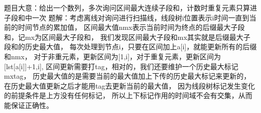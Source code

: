 题目大意：给出一个数列，多次询问区间最大连续子段和，计数时重复元素只算进子段和中一次
题解：考虑离线对询问进行扫描线，线段树i位置表示i时间一直到当前的时间节点的累加值，
区间最大值nmx表示当前时间为终点的后缀最大子段和，记mx为区间最大子段和，
我们发现区间最大子段和mx其实就是后缀最大子段和的历史最大值，
每次处理到节点i，只要在区间加上a[i]，就能更新所有的后缀和nmx，
对于非重元素，更新区间为[1,i]，对于重复元素，更新区间为[lst[a[i]]+1,i],
区间更新需要打tag，相对的，我们还要维护一个历史最大标记mxtag，
历史最大值的是需要当前的最大值加上下传的历史最大标记来更新的，
在历史最大值更新之后才能用tag去更新当前的最大值，
因为线段树标记发生变化的前提条件是上方没有任何标记，
所以上下标记作用的时间域不会有交集，从而能保证正确性。